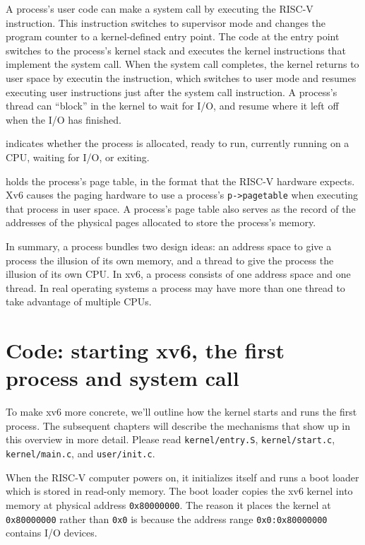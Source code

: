 A process's user code
can make a system call by executing the RISC-V 
instruction. This instruction switches to supervisor mode and
changes the program counter to a kernel-defined entry point.  The code
at the entry point switches to the process's kernel stack and executes the kernel
instructions that implement the system call.  When the system call
completes, the kernel returns to
user space by executin the  instruction, which switches
to user mode and resumes executing user instructions
just after the system call instruction.  A process's thread can
``block'' in the kernel to wait for I/O, and resume where it left off
when the I/O has finished.

indicates whether the process is allocated, ready
to run, currently running on a CPU, waiting for I/O, or exiting.

holds the process's page table, in the format
that the RISC-V hardware expects.
Xv6 causes the paging hardware to use a process's
\lstinline{p->pagetable}
when executing that process in user space.
A process's page table also serves as the record of the
addresses of the physical pages allocated to store the process's
memory.

In summary, a process bundles two design ideas: an address space to
give a process the illusion of its own memory, and a thread to give
the process the illusion of its own CPU.  In xv6, a process consists
of one address space and one thread.  In real operating systems a
process may have more than one thread to take advantage of multiple CPUs.

\section{Code: starting xv6, the first process and system call}
To make xv6 more concrete, we'll outline how the kernel starts and
runs the first process. The subsequent chapters will describe the
mechanisms that show up in this overview in more detail.
Please read {\tt kernel/entry.S}, {\tt kernel/start.c},
{\tt kernel/main.c}, and {\tt user/init.c}.

When the RISC-V computer powers on, it initializes
itself and runs a boot loader which is stored in read-only
memory.  The boot loader copies the xv6 kernel into memory
at physical address
\texttt{0x80000000}.
The reason it places the kernel at
\texttt{0x80000000}
rather than
\texttt{0x0}
is because the address range
\texttt{0x0:0x80000000}
contains I/O devices.


